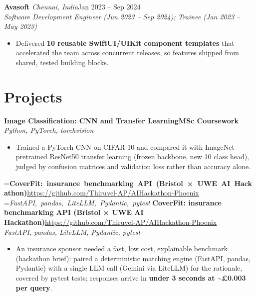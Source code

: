 \documentclass[a4paper,11pt]{article}
\newcommand{\role}[4]{%
  \textbf{#1}{\color{muted}\,\textperiodcentered\,\textit{#2}}\hfill{\color{muted}#3}\\
  \textit{#4}\par}
\newcommand{\project}[3]{%
  \textbf{#1}\hfill#3\\ {\color{muted}\small\textit{#2}}\par}
\newcommand{\badge}[1]{{\color{navy}\small\textbf{#1}}}
\newcommand{\gap}{\vspace{5pt}}
\newcommand{\num}[1]{\textbf{#1}}   %
\begin{document}
\gap
{}
\role{Avasoft}{Chennai, India}{Jan 2023 – Sep 2024}{Software Development Engineer (Jun 2023 – Sep 2024); Trainee (Jan 2023 – May 2023)}
\begin{itemize}
  \item Delivered \num{10 reusable SwiftUI/UIKit component templates} that accelerated the team across concurrent releases, so features shipped from shared, tested building blocks.
\end{itemize}

\section{Projects}
\project{Image Classification: CNN and Transfer Learning}{Python, PyTorch, torchvision}{\badge{MSc Coursework}}
\begin{itemize}
  \item Trained a PyTorch CNN on CIFAR-10 and compared it with ImageNet pretrained ResNet50 transfer learning (frozen backbone, new 10 class head), judged by confusion matrices and validation loss rather than accuracy alone.
\end{itemize}
\gap
{}
=\hbox{\textbf{CoverFit: insurance benchmarking API (Bristol × UWE AI Hackathon)}\hspace{1em}\url{https://github.com/Thiruvel-AP/AIHackathon-Phoenix}}%
=\hbox{{\small\textit{FastAPI, pandas, LiteLLM, Pydantic, pytest}}}%
\ifdim\wd0>\linewidth
\ifdim\wd2>\linewidth
\textbf{CoverFit: insurance benchmarking API (Bristol × UWE AI Hackathon)}\\ {\color{muted}\small\textit{FastAPI, pandas, LiteLLM, Pydantic, pytest}}\\ \hfill{\small\url{https://github.com/Thiruvel-AP/AIHackathon-Phoenix}}\par
\else
\textbf{CoverFit: insurance benchmarking API (Bristol × UWE AI Hackathon)}\\ {\color{muted}\small\textit{FastAPI, pandas, LiteLLM, Pydantic, pytest}}\hfill{\small\url{https://github.com/Thiruvel-AP/AIHackathon-Phoenix}}\par
\fi
\else
\project{CoverFit: insurance benchmarking API (Bristol × UWE AI Hackathon)}{FastAPI, pandas, LiteLLM, Pydantic, pytest}{\url{https://github.com/Thiruvel-AP/AIHackathon-Phoenix}}
\fi
\begin{itemize}
  \item An insurance sponsor needed a fast, low cost, explainable benchmark (hackathon brief): paired a deterministic matching engine (FastAPI, pandas, Pydantic) with a single LLM call (Gemini via LiteLLM) for the rationale, covered by pytest tests; responses arrive in \num{under 3 seconds at \textasciitilde{}£0.003 per query}.
\end{itemize}
\end{document}
